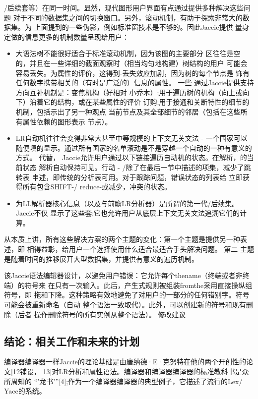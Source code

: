 \begin{enumerate}
	/后续套等）在同一时间。显然，现代图形用户界面有点通过提供多种解决这些问题
	对于不同的数据集之间的切换窗口。另外，滚动机制，有助于探索非常大的数据集。为
	上面提到的一些伪影，例如标准窗技术是不够的。因此Jaccie提供
	量身定做的信息更多的机制数量呈现给用户：
	\begin{itemize}
		\item 大语法树不能很好适合于标准滚动机制，因为该图的主要部分
		区往往是空的，并且在一些详细的截面观察时（相当均匀地构建）树结构的用户
		可能会容易丢失。为属性的评价，这得到-丢失效应加剧，因为树的每个节点是
		饰有任何数字携带相关的（有时是广泛的）信息的属性。 一些
		通过Jaccie提供支持方向互补机制是：变焦机构（好相对
		小乔木）;用于遍历树的机构（向上或向下）沿着它的结构，或在某些属性的评价
		订购;用于接通和关断特性的细节的机制，包括示出了另一种观点
		当前节点及其全部细节的邻居（包括在这些所有属性依赖的图形表示
		节点）。
		\item LR自动机往往会变得非常大甚至中等规模的上下文无关文法 - 一个国家可以
		随便填的显示。通过所有国家的名单滚动是不是穿越一个自动的一种有意义的方式。 代替，
		Jaccie允许用户通过以下链接遍历自动机的状态。在解析，的当前状态
		解析自动保持可见。行动 - /除了在最后一节中描述的项集，减少了跳转表
		申述，即传统的分析表可用。对于跟踪问题，错误状态的列表给
		立即获得所有包含SHIFT-/ reduce-或减少，冲突的状态。
		\item 
		为LL解析器核心信息（以及与前瞻LR分析器）是所谓的第一代/后续集。 Jaccie不仅
		显示了这些套;它也允许用户从底层上下文无关文法追溯它们的计算。
	\end{itemize}
从本质上讲，所有这些解决方案的两个主题的变化：第一个主题是提供另一种表述，即
相得益彰，给用户一个选择使用什么适合最适合手头解决问题。 第二
主题是随着时间的推移展开大型数据集，并提供有意义的遍历机制。
	

该Jaccie语法编辑器设计，以避免用户错误：它允许每个thename（终端或者非终端）的符号来
在只有一次输入。此后，产生式规则被组装fromthe采用直接操纵组符号，即
拖和下降。这种策略有效地避免了对用户的一部分的任何错别字。符号可能会被重新命名（自动
整个语法一致取代）。此外，可以创建新的符号和现有删除（后者
操作删除符号的所有实例从整个语法）。
修改建议
\end{enumerate}
\subsection{结论：相关工作和未来的计划}
编译器编译器一样Jaccie的理论基础是由唐纳德·E·克努特在他的两个开创性的论文[12铺设，
13]对LR分析和属性语法。编译器和编译器编译器的标准教科书是众所周知的
“'龙书'”[4];作为一个编译器编译器的典型例子，它描述了流行的Lex/ Yacc的系统。

